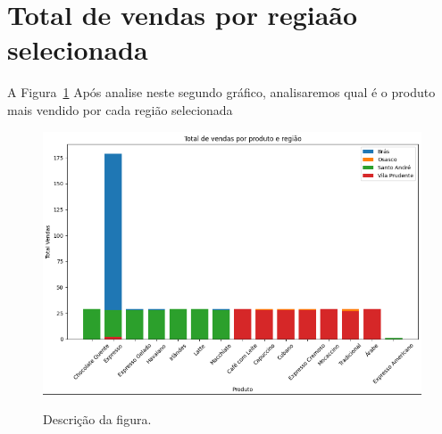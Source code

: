 \section{Total de vendas por regiaão selecionada}
\label{sec:figura}
A Figura~\ref{figuras/Total-vendas-produto-regiao.png} Após analise neste segundo gráfico, analisaremos qual é o produto mais vendido por cada região selecionada
\begin{figure}[!ht]
	{\centering
		\caption{Descrição da figura.}
		\includegraphics[width=1.0\textwidth]{figuras/Total-vendas-produto-regiao.png}
		\label{figuras/Total-vendas-produto-regiao.png}
	}
\end{figure} \\ \\ \\ \\ \\ \\ \\ \\ \\ 

